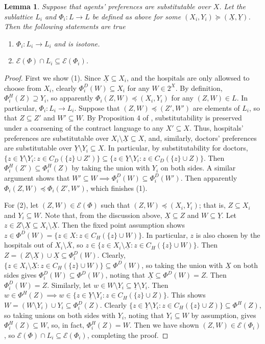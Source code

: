 \documentclass[11pt,reqno]{amsart}
\newtheorem{lemma}[thm]{Lemma}
\theoremstyle{definition}
\numberwithin{equation}{section}
\newcommand{\prf}{\begin{proof}}
\newcommand{\eprf}{\end{proof}}
\newcommand{\lft}{\left(}
\newcommand{\rt}{\right)}
\newcommand{\ol}{\overline}
\newcommand{\ul}{\underline}
\newcommand{\sub}{\subseteq}
\newcommand{\fix}{\mathcal{E}}
\newcommand{\suq}{\succeq}
\newcommand{\peq}{\preceq}
\newcommand{\lattice}{L}
\newcommand{\topx}{\ol{X}}
\newcommand{\botx}{\ul{X}}
\newcommand{\boty}{\ul{Y}}
\begin{document}
\begin{lemma} \label{lemma:phigar}
Suppose that agents' preferences are substitutable over $X$.
Let the sublattice $\lattice_i$ and $\Phi_i: \lattice \to \lattice$ be defined as above for some $(X_i, Y_i) \suq (\botx, \boty)$. 
Then the following statements are true
\begin{enumerate}
\item $\Phi_i: \lattice_i \to \lattice_i$ and is isotone. 
\item$\fix(\Phi) \cap \lattice_i \sub \fix(\Phi_i)$.
\end{enumerate}
\end{lemma}
\prf 
First we show (1). 
Since $\botx \sub X_i$, and the hospitals are only allowsed to choose from $X_i$, clearly $\Phi^D_i(W) \sub X_i$ for any $W \in 2^X$.
By definition, $\Phi^H_i(Z) \supseteq Y_i$, so apparently $\Phi_i(Z,W) \peq (X_i, Y_i)$ for any $(Z,W) \in \lattice$. 
In particular, $\Phi_i: \lattice_i \to \lattice_i$.
Suppose that $(Z,W) \peq (Z',W')$ are elements of $\lattice_i$, so that $Z \sub Z'$ and $W' \sub W$.
By Proposition 4 of \cite{HatfieldKominers2010b}, substitutability is preserved under a coarsening of the contract language to any $X' \sub X$.
Thus, hospitals' preferences are substitutable over $X_i \setminus \botx \sub X$, and, similarly, doctors' preferences are substitutable over $\boty \setminus Y_i \sub X$.
In particular, by substitutability for doctors, $\{z \in \boty \setminus Y_i: z \in C_D( \{z \} \cup Z') \} \sub \{z \in \boty \setminus Y_i: z \in C_D( \{z \} \cup Z) \}$. 
Then $\Phi_i^H(Z') \sub \Phi_i^H(Z)$ by taking the union with $Y_i$ on both sides.
A similar argument shows that $W' \sub W \implies \Phi^D_i(W) \sub \Phi^D_i(W')$.
Then apparently $\Phi_i(Z,W) \peq \Phi_i(Z',W')$, which finishes (1).

For (2), let $(Z,W) \in \fix(\Phi)$ such that $(Z,W) \peq (X_i,Y_i)$; that is, $Z \sub X_i$ and $Y_i \sub W$.
Note that, from the discussion above, $\botx \sub Z$ and $W \sub \boty$.
Let $z \in Z \setminus \botx \sub X_i \setminus \botx$.
Then the fixed point assumption shows $z \in \Phi^D(W) = \{z \in X: z \in C_H( \{z \} \cup W) \}$. 
In particular, $z$ is also chosen by the hospitals out of $X_i \setminus \topx$, so $z \in \{z \in X_i \setminus \botx: z \in C_H( \{z \} \cup W) \}$. 
Then $Z = \lft Z \setminus \botx \rt \cup \botx \sub \Phi_i^D(W)$. 
Clearly, $\{z \in X_i \setminus \botx: z \in C_H( \{z \} \cup W) \} \sub \Phi^D(W)$, so taking the union with $\botx$ on both sides gives $\Phi_i^D(W) \sub \Phi^D(W)$, noting that $\botx \sub \Phi^D(W) = Z$. 
Then $\Phi_i^D(W) = Z$.
Similarly, let $w \in W \setminus Y_i \sub \boty \setminus Y_i$. 
Then $w \in \Phi^H(Z) \implies w \in \{z \in \boty \setminus Y_i: z \in C_H( \{z \} \cup Z) \}$. 
This shows $W = \lft W \setminus Y_i \rt \cup Y_i \sub \Phi^D_i(Z)$.
Clearly $\{z \in \boty \setminus Y_i: z \in C_H( \{z \} \cup Z) \} \sub \Phi^H(Z)$, so taking unions on both sides with $Y_i$, noting that $Y_i \sub W$ by assumption, gives $\Phi^H_i(Z) \sub W$, so, in fact, $\Phi^H_i(Z) = W$.
Then we have shown $(Z,W) \in \fix(\Phi_i)$, so $\fix(\Phi) \cap \lattice_i \sub \fix(\Phi_i)$, completing the proof.
\eprf
\end{document}
